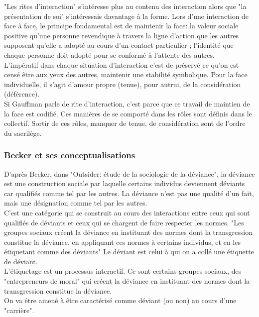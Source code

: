 \documentclass[10pt, a4paper, openany]{book}
\begin{document}
"Les rites d'interaction" s'intéresse plus au contenu des interaction alors que "la présentation de soi" s'intéressais davantage à la forme. Lors d'une interaction de face à face, le principe fondamental est de maintenir la face: la valeur sociale positive qu'une personne revendique à travers la ligne d'action que les autres supposent qu'elle a adopté au cours d'un contact particulier ; l'identité que chaque personne doit adopté pour se conformé à l'attente des autres. \\
L'impératif dans chaque situation d'interaction c'est de préservé ce qu'on est censé être aux yeux des autres, maintenir une stabilité symbolique. Pour la face individuelle, il s'agit d'amour propre (tenue), pour autrui, de la considération (déférence). \\
Si Gauffman parle de rite d'interaction, c'est parce que ce travail de maintien de la face est codifié. Ces manières de se comporté dans les rôles sont définis dans le collectif. Sortir de ces rôles, manquer de tenue, de considération sont de l'ordre du sacrilège. 

\subsubsection{Becker et ses conceptualisations}

D'après Becker, dans "Outsider: étude de la sociologie de la déviance", la déviance est une construction sociale par laquelle certains individus deviennent déviants car qualifiés comme tel par les autres. La déviance n'est pas une qualité d'un fait, mais une désignation comme tel par les autres. \\
C'est une catégorie qui se construit au cours des interactions entre ceux qui sont qualifiés de déviants et ceux qui se chargent de faire respecter les normes. "Les groupes sociaux créent la déviance en instituant des normes dont la transgression constitue la déviance, en appliquant ces normes à certains individus, et en les étiquetant comme des déviants" Le déviant est celui à qui on a collé une étiquette de déviant. \\
L'étiquetage est un processus interactif. Ce sont certains groupes sociaux, des "entrepreneurs de moral" qui créent la déviance en instituant des normes dont la transgression constitue la déviance. \\
On va être amené à être caractérisé comme déviant (ou non) au cours d'une "carrière".
\end{document}
